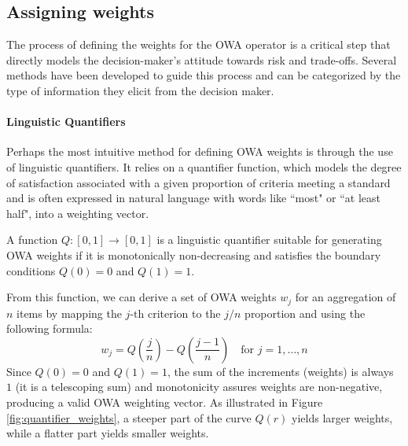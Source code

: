 \subsection{Assigning weights}



The process of defining the weights for the OWA operator is a critical step that directly models the decision-maker's attitude towards risk and trade-offs. Several methods have been developed to guide this process and can be categorized by the type of information they elicit from the decision maker.



\paragraph{Linguistic Quantifiers}
Perhaps the most intuitive method for defining OWA weights is through the use of linguistic quantifiers. It relies on a quantifier function, which models the degree of satisfaction associated with a given proportion of criteria meeting a standard and is often expressed in natural language with words like ``most" or ``at least half", into a weighting vector. 

\begin{definition}
    A function $Q: [0, 1] \to [0, 1]$ is a linguistic quantifier suitable for generating OWA weights if it is monotonically non-decreasing and satisfies the boundary conditions $Q(0) = 0$ and $Q(1) = 1$.
    \end{definition}

From this function, we can derive a set of OWA weights $w_j$ for an aggregation of $n$ items by mapping the $j\text{-th}$ criterion to the $j/n$ proportion and using the following formula:
    \begin{equation}
        w_j = Q\left(\frac{j}{n}\right) - Q\left(\frac{j-1}{n}\right) \quad \text{for } j=1, \dots, n
        \label{eq:quantifier_weights}
    \end{equation}
Since $Q(0)=0$ and $Q(1)=1$, the sum of the increments (weights) is always $1$ (it is a telescoping sum) and monotonicity assures weights are non-negative, producing a valid OWA weighting vector. As illustrated in Figure \ref{fig:quantifier_weights}, a steeper part of the curve $Q(r)$ yields larger weights, while a flatter part yields smaller weights.\\





